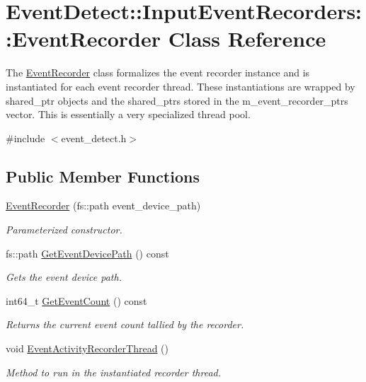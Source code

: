 \hypertarget{classEventDetect_1_1InputEventRecorders_1_1EventRecorder}{}\section{Event\+Detect\+:\+:Input\+Event\+Recorders\+:\+:Event\+Recorder Class Reference}
\label{classEventDetect_1_1InputEventRecorders_1_1EventRecorder}


The \mbox{\hyperlink{classEventDetect_1_1InputEventRecorders_1_1EventRecorder}{Event\+Recorder}} class formalizes the event recorder instance and is instantiated for each event recorder thread. These instantiations are wrapped by shared\+\_\+ptr objects and the shared\+\_\+ptrs stored in the m\+\_\+event\+\_\+recorder\+\_\+ptrs vector. This is essentially a very specialized thread pool.  




{\ttfamily \#include $<$event\+\_\+detect.\+h$>$}

\subsection*{Public Member Functions}
\begin{DoxyCompactItemize}
\item 
\mbox{\hyperlink{classEventDetect_1_1InputEventRecorders_1_1EventRecorder_af865f9dcce55575066f874f93701e03d}{Event\+Recorder}} (fs\+::path event\+\_\+device\+\_\+path)
\begin{DoxyCompactList}\small\item\em Parameterized constructor. \end{DoxyCompactList}\item 
fs\+::path \mbox{\hyperlink{classEventDetect_1_1InputEventRecorders_1_1EventRecorder_a70c83db169bbe5172bb170ac5b22b70b}{Get\+Event\+Device\+Path}} () const
\begin{DoxyCompactList}\small\item\em Gets the event device path. \end{DoxyCompactList}\item 
int64\+\_\+t \mbox{\hyperlink{classEventDetect_1_1InputEventRecorders_1_1EventRecorder_a33725666187f177b9961bbd65d8fd944}{Get\+Event\+Count}} () const
\begin{DoxyCompactList}\small\item\em Returns the current event count tallied by the recorder. \end{DoxyCompactList}\item 
\mbox{\label{classEventDetect_1_1InputEventRecorders_1_1EventRecorder_ab99ec2e4391f0423a876164c8c19b80f}} 
void \mbox{\hyperlink{classEventDetect_1_1InputEventRecorders_1_1EventRecorder_ab99ec2e4391f0423a876164c8c19b80f}{Event\+Activity\+Recorder\+Thread}} ()
\begin{DoxyCompactList}\small\item\em Method to run in the instantiated recorder thread. \end{DoxyCompactList}\end{DoxyCompactItemize}
